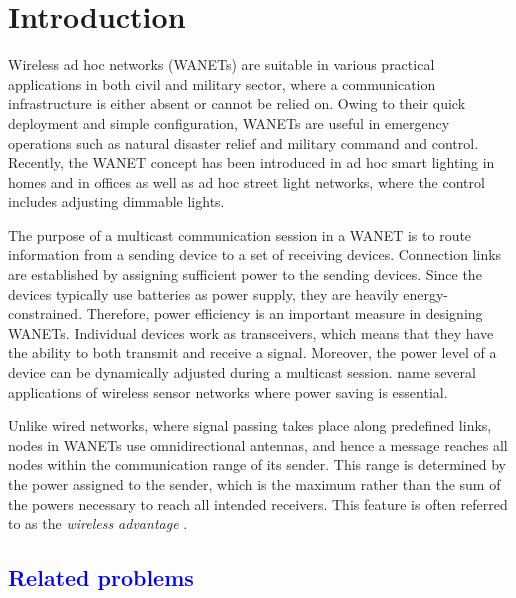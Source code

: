 \section{Introduction}
\label{intro}

Wireless ad hoc networks (WANETs) are suitable in various practical applications in both civil and military sector, where a communication infrastructure is either absent or cannot be relied on.
Owing to their quick deployment and simple configuration, WANETs are useful in emergency operations such as natural disaster relief and military command and control.
Recently, the WANET concept has been introduced in ad hoc smart lighting in homes and in offices as well as ad hoc street light networks, where the control includes adjusting dimmable lights.
 
The purpose of a multicast communication session in a WANET is to route information from a sending device to a set of receiving devices.
Connection links are established by assigning sufficient power to the sending devices.
Since the devices typically use batteries as power supply, they are heavily energy-constrained.
Therefore, power efficiency is an important measure in designing WANETs.
Individual devices work as transceivers, which means that they have the ability to both transmit and receive a signal.
Moreover, the power level of a device can be dynamically adjusted during a multicast session.
\citet{montemanni11} name several applications of wireless sensor networks where power saving is essential.

Unlike wired networks, where signal passing takes place along predefined links, nodes in WANETs use omnidirectional antennas, and hence a message reaches all nodes within the communication range of its sender.
This range is determined by the power assigned to the sender, which is the maximum rather than the sum of the powers necessary to reach all intended receivers.
This feature is often referred to as the \emph{wireless advantage} \citep{Wieseltier00onthe}.

\textcolor{blue}{\subsection{Related problems}}

